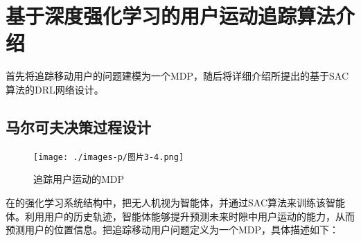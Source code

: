 \documentclass{article}
\begin{document}
\section{基于深度强化学习的用户运动追踪算法介绍}\label{section3-2}
首先将追踪移动用户的问题建模为一个MDP，随后将详细介绍所提出的基于SAC算法的DRL网络设计。

\subsection{马尔可夫决策过程设计}\label{section3-2-1}
\begin{figure}[htbp]
	\centering
	\texttt{[image: ./images-p/图片3-4.png]}
	\caption{追踪用户运动的MDP}
	\label{Fig3-4}
\end{figure}
在的强化学习系统结构中，把无人机视为智能体，并通过SAC算法来训练该智能体。利用用户的历史轨迹，智能体能够提升预测未来时隙中用户运动的能力，从而预测用户的位置信息。把追踪移动用户问题定义为一个MDP，具体描述如下：
\end{document}
